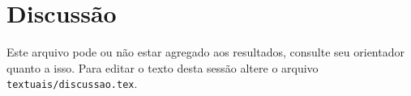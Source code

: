 \chapter{Discussão}

Este arquivo pode ou não estar agregado aos resultados, consulte seu orientador quanto a isso. Para editar o texto desta sessão altere o arquivo \verb|textuais/discussao.tex|.